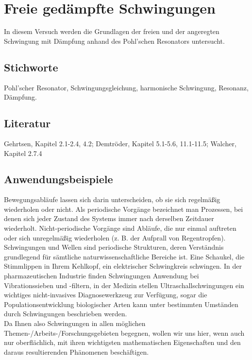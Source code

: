 \chapter{Freie gedämpfte Schwingungen}
\label{vn:1}

In diesem Versuch werden die Grundlagen der freien und der angeregten Schwingung mit Dämpfung anhand des Pohl'schen Resonators untersucht.


\section{Stichworte}
Pohl'scher Resonator, Schwingungsgleichung, harmonische Schwingung, Resonanz, Dämpfung.
%
\section{Literatur}
Gehrtsen, Kapitel 2.1-2.4, 4.2; Demtröder, Kapitel 5.1-5.6, 11.1-11.5; Walcher, Kapitel 2.7.4
%
\section{Anwendungsbeispiele}
%
Bewegungsabläufe lassen sich darin unterscheiden, ob sie sich regelmäßig wiederholen oder nicht. Als periodische Vorgänge bezeichnet man Prozessen, bei denen sich jeder Zustand des Systems immer nach derselben Zeitdauer wiederholt. Nicht-periodische Vorgänge sind Abläufe, die nur einmal auftreten oder sich unregelmäßig wiederholen (z. B. der Aufprall von Regentropfen).\\
Schwingungen und Wellen sind periodische Strukturen, deren Verständnis grundlegend für sämtliche naturwissenschaftliche Bereiche ist. Eine Schaukel, die Stimmlippen in Ihrem Kehlkopf, ein elektrischer Schwingkreis schwingen. In der pharmazeutischen Industrie finden Schwingungen Anwendung bei Vibrationssieben und -filtern, in der Medizin stellen Ultraschallschwingungen ein wichtiges nicht-invasives Diagnosewerkzeug zur Verfügung, sogar die Populationsentwicklung biologischer Arten kann unter bestimmten Umständen durch Schwingungen beschrieben werden.\\
Da Ihnen also Schwingungen in allen möglichen Themen-/Arbeits-/Forschungsgebieten begegnen, wollen wir uns hier, wenn auch nur oberflächlich, mit ihren wichtigsten mathematischen Eigenschaften und den daraus resultierenden Phänomenen beschäftigen.
%
